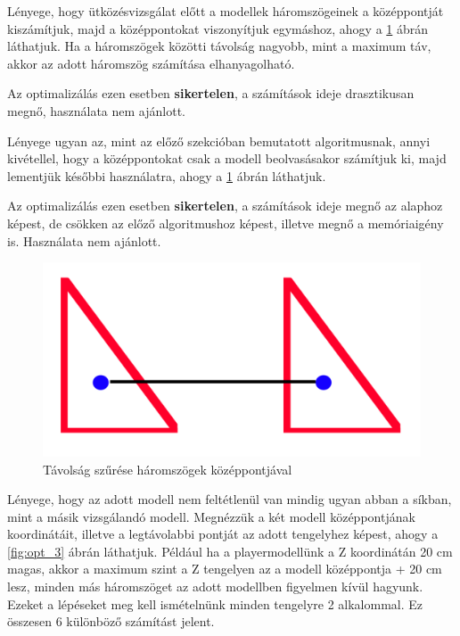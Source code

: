 \newpage
{}
Lényege, hogy ütközésvizsgálat előtt a modellek háromszögeinek a középpontját kiszámítjuk, majd a középpontokat viszonyítjuk egymáshoz, ahogy a \ref{fig:opt_2} ábrán láthatjuk. Ha a háromszögek közötti távolság nagyobb, mint a maximum táv, akkor az adott háromszög számítása elhanyagolható.

Az optimalizálás ezen esetben \textbf{sikertelen}, a számítások ideje drasztikusan megnő, használata nem ajánlott.

Lényege ugyan az, mint az előző szekcióban bemutatott algoritmusnak, annyi kivétellel, hogy a középpontokat csak a modell beolvasásakor számítjuk ki, majd lementjük későbbi használatra, ahogy a \ref{fig:opt_2} ábrán láthatjuk.

Az optimalizálás ezen esetben \textbf{sikertelen}, a számítások ideje megnő az alaphoz képest, de csökken az előző algoritmushoz képest, illetve megnő a memóriaigény is. Használata nem ajánlott.
\begin{figure}[h]
	\centering
	\includegraphics[width=13truecm, height=7.5truecm]{images/opt_5.2.png}
	\caption{Távolság szűrése háromszögek középpontjával}
	\label{fig:opt_2}
\end{figure}

\newpage
{}
Lényege, hogy az adott modell nem feltétlenül van mindig ugyan abban a síkban, mint a másik vizsgálandó modell. Megnézzük a két modell középpontjának koordinátáit, illetve a legtávolabbi pontját az adott tengelyhez képest, ahogy a \ref{fig:opt_3} ábrán láthatjuk. Például ha a playermodellünk a Z koordinátán 20 cm magas, akkor a maximum szint a Z tengelyen az a modell középpontja + 20 cm lesz, minden más háromszöget az adott modellben figyelmen kívül hagyunk. Ezeket a lépéseket meg kell ismételnünk minden tengelyre 2 alkalommal. Ez összesen 6 különböző számítást jelent.

